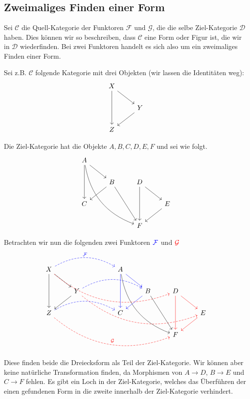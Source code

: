 \documentclass[a4paper]{amsart}
\theoremstyle{definition}
\begin{document}
\subsection{Zweimaliges Finden einer Form}
Sei $\mathcal C$ die Quell-Kategorie der Funktoren $\mathcal F$ und $\mathcal G$, die die selbe Ziel-Kategorie $\mathcal D$ haben. Dies können wir so beschreiben, dass $\mathcal C$ eine Form oder Figur ist, die wir in $\mathcal D$ wiederfinden. Bei zwei Funktoren handelt es sich also um ein zweimaliges Finden einer Form.

Sei z.B. $\mathcal C$ folgende Kategorie mit drei Objekten (wir lassen die Identitäten weg):
\begin{equation}
   \begin{tikzcd}
      X \arrow[dd] \arrow[dr] \\ 
                 & Y \arrow[dl]\\
      Z   
   \end{tikzcd}
\end{equation}

Die Ziel-Kategorie hat die Objekte $A,B,C,D,E,F$ und sei wie folgt. 
\begin{equation}
   \begin{tikzcd}
     A \arrow[dd] \arrow[dr] \arrow[dddrr, bend right] \\ 
      &B \arrow[dl] \arrow[ddr] &D \arrow[dd] \arrow[dr]\\
      C &&& E \arrow[dl]\\
     &&F
   \end{tikzcd}
\end{equation}

Betrachten wir nun die folgenden zwei Funktoren $\color{blue} \mathcal F$ und $\color{red} \mathcal G$
\begin{equation}
   \begin{tikzcd}
      X \arrow[dd] \arrow[dr] \arrow[rrr, blue, dashed, bend left, "\mathcal F"] \arrow[rrrrrd, red, dashed, bend right] &&& A \arrow[dd, blue] \arrow[dr, blue] \arrow[dddrr, bend right]\\ 
      & Y \arrow[dl] \arrow[rrr, blue, dashed, bend left] \arrow[rrrrrd, red, dashed, bend right] &&&B \arrow[dl, blue] \arrow[ddr] &D \arrow[dd, red] \arrow[dr, red]\\
      Z \arrow[rrr, blue, dashed, bend left] \arrow[rrrrrd, red, dashed, bend right, "\mathcal G"] &&&C &&& E \arrow[dl, red]\\
      &&&&&F
   \end{tikzcd}
\end{equation}
Diese finden beide die Dreiecksform als Teil der Ziel-Kategorie. Wir können aber keine natürliche Transformation finden, da Morphismen von $A \to D$, $B \to E$ und $C \to F$ fehlen. Es gibt ein Loch in der Ziel-Kategorie, welches das Überführen der einen gefundenen Form in die zweite innerhalb der Ziel-Kategorie verhindert.
\end{document}
